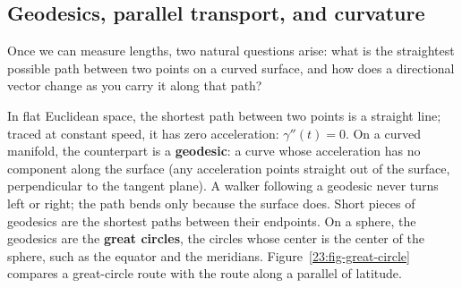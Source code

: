 \subsection{Geodesics, parallel transport, and curvature}

Once we can measure lengths, two natural questions arise: what is the straightest possible path between two points on a curved surface, and how does a directional vector change as you carry it along that path?

In flat Euclidean space, the shortest path between two points is a straight line; traced at constant speed, it has zero acceleration: $\gamma''(t) = 0$. On a curved manifold, the counterpart is a \textbf{geodesic}: a curve whose acceleration has no component along the surface (any acceleration points straight out of the surface, perpendicular to the tangent plane). A walker following a geodesic never turns left or right; the path bends only because the surface does. Short pieces of geodesics are the shortest paths between their endpoints. On a sphere, the geodesics are the \textbf{great circles}, the circles whose center is the center of the sphere, such as the equator and the meridians. Figure~\ref{23:fig-great-circle} compares a great-circle route with the route along a parallel of latitude.

